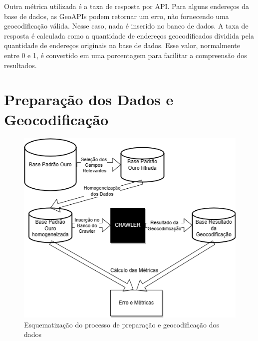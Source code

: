 Outra métrica utilizada é a taxa de resposta por API. Para alguns endereços da base de dados, as GeoAPIs podem retornar um erro, não fornecendo uma geocodificação válida. Nesse caso, nada é inserido no banco de dados. A taxa de resposta é calculada como a quantidade de endereços geocodificados dividida pela quantidade de endereços originais na base de dados. Esse valor, normalmente entre 0 e 1, é convertido em uma porcentagem para facilitar a compreensão dos resultados.


\section{Preparação dos Dados e Geocodificação}

\begin{figure}
    \centering
    \includegraphics[width=\textwidth]{Figuras/diagrama monografia.drawio.png}
    \caption{Esquematização do processo de preparação e geocodificação dos dados}
    \label{fig:diagramaMono}
\end{figure}

